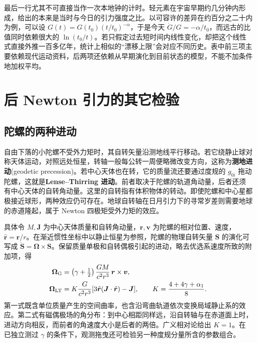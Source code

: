 最后一行尤其不可直接当作一次本地钟的计时。轻元素在宇宙早期约几分钟内形成，给出的本来是当时与今日的引力强度之比。以可容许的差异在约百分之二十内为例，可以设 $G(t)=G(t_0)(t/t_0)^{-\alpha}$，于是今天 $\dot G/G=-\alpha/t_0$，而远古的比值同时依赖很大的 $\ln(t_0/t)$。若只假定过去短时间内线性变化，却把这个线性式直接外推一百多亿年，统计上相似的“漂移上限”会对应不同历史。表中前三项主要依赖现代运动资料，后两项还依赖从早期演化到目前状态的模型，不能不加条件地加权平均。

\section{后 Newton 引力的其它检验}

\subsection{陀螺的两种进动}\label{sec:pn-gyro-observe}

自由下落的小陀螺不受外力矩时，其自转矢量沿测地线平行移动。若它绕静止球对称天体运动，对照远处恒星，转轴一般每公转一周便略微改变方向，这称为\textbf{测地进动}(geodetic precession)。若中心天体也在转，它的质量流还要通过度规的 $g_{0i}$ 拖动陀螺，这就是\textbf{Lense--Thirring 进动}。前者取决于陀螺的轨道角动量，后者还须有中心天体的自转角动量。这里的自转指有体积物体的转动。即使陀螺和中心星都极接近球形，两种效应仍可存在。地球自转轴在日月引力下的寻常岁差则需要地球的赤道隆起，属于 Newton 四极矩受外力矩的效应。

具体令 $M,\bm J$ 为中心天体质量和自转角动量，$\bm r,\bm v$ 为陀螺的相对位置、速度，$\hat{\bm r}=\bm r/r$。在渐近惯性坐标中以静止恒星为参照，陀螺的物理自转矢量 $\bm S$ 的演化可写成 $\dot{\bm S}=\bm\Omega\times\bm S$。保留质量单极和自转偶极引起的进动，略去优选系速度所致的附加项，得
\begin{align*}
    \bm\Omega_{\rm G}&=\left(\gamma+\tfrac12\right)
          \frac{GM}{c^2r^3}\,\bm r\times\bm v,\\
    \bm\Omega_{\rm LT}&=K\frac{G}{c^2r^3}
            [3\hat{\bm r}(\bm J\cdot\hat{\bm r})-\bm J],
       \qquad K=\frac{4+4\gamma+\alpha_1}{8}.
\end{align*}
第一式既含单位质量产生的空间曲率，也含沿弯曲轨道依次变换局域静止系的效应。第二式有磁偶极场的角分布：到中心相距同样远，沿自转轴与在赤道面上时，进动方向相反，而前者的角速度大小是后者的两倍。广义相对论给出 $K=1$。在已独立测过 $\gamma$ 的条件下，观测拖曳还可检验另一种度规分量所含的参数组合。

